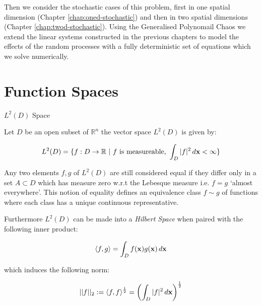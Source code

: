 Then we consider the stochastic cases of this problem, first in one spatial
dimension (Chapter \ref{chap:oned-stochastic}) and then in two spatial
dimensions (Chapter \ref{chap:twod-stochastic}). Using the Generalised
Polynomail Chaos we extend the linear systems constructed in the previous
chapters to model the effects of the random processes with a fully
deterministic set of equations which we solve numerically.

\section{Function Spaces}\label{sec:definitions}

\begin{definition}\label{def:L2-D}
    $L^2(D)$ Space

    Let $D$ be an open subset of $\mathbb{R}^n$ the vector space $L^2(D)$ is
    given by:

    \begin{equation}\label{eq:L2-D}
        L^2(D) = \{f: D \rightarrow \mathbb{R}\ |\ f \text{ is measureable, }
                    \int_D|f|^2\, d\mathbf{x} < \infty\}
    \end{equation}

    Any two elements $f,g$ of $L^2(D)$ are still considered equal if they
    differ only in a set $A \subset D$ which has measure zero w.r.t the
    Lebesque measure i.e. $f = g$ `almost everywhere'. This notion of equality
    defines an equivalence class $f \sim g$ of functions where each class has a
    unique continuous representative.

    Furthermore $L^2(D)$ can be made into a \textit{Hilbert Space} when paired
    with the following inner product:

    \begin{equation}\label{eq:L2-D-inner-product}
        \langle f,g \rangle = \int_Df(\mathbf{x})g(\mathbf{x})\, d\mathbf{x}
    \end{equation}

    which induces the following norm:

    \begin{equation}\label{eq:L2-D-norm}
        ||f||_2 := \langle f, f\rangle^{\frac{1}{2}}
                 = \left(\int_D|f|^2\, d\mathbf{x}\right)^{\frac{1}{2}}
    \end{equation}

\end{definition}

